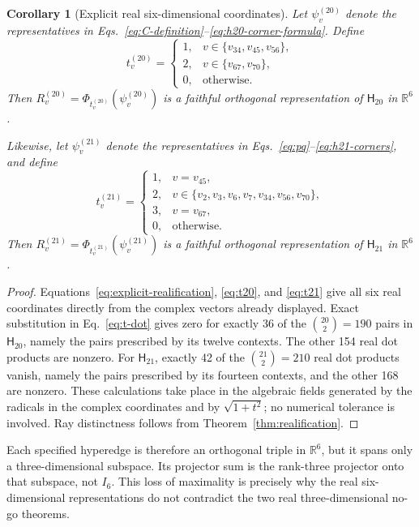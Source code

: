\documentclass[12pt,a4paper]{article}
\newtheorem{corollary}[theorem]{Corollary}
\theoremstyle{definition}
\theoremstyle{remark}
\newcommand{\R}{\mathbb R}
\newcommand{\Htwenty}{\mathsf H_{20}}
\newcommand{\Htwentyone}{\mathsf H_{21}}
\begin{document}
\begin{corollary}[Explicit real six-dimensional coordinates]
\label{cor:r6}
Let $\psi_v^{(20)}$ denote the representatives in
Eqs.~\eqref{eq:C-definition}--\eqref{eq:h20-corner-formula}.  Define
\begin{equation}
 t_v^{(20)}=
 \begin{cases}
  1,&v\in\{v_{34},v_{45},v_{56}\},\\
  2,&v\in\{v_{67},v_{70}\},\\
  0,&\text{otherwise}.
 \end{cases}
 \label{eq:t20}
\end{equation}
Then $R_v^{(20)}=\Phi_{t_v^{(20)}}(\psi_v^{(20)})$ is a faithful orthogonal
representation of $\Htwenty$ in $\R^6$.

Likewise, let $\psi_v^{(21)}$ denote the representatives in
Eqs.~\eqref{eq:pq}--\eqref{eq:h21-corners}, and define
\begin{equation}
 t_v^{(21)}=
 \begin{cases}
  1,&v=v_{45},\\
  2,&v\in\{v_2,v_3,v_6,v_7,v_{34},v_{56},v_{70}\},\\
  3,&v=v_{67},\\
  0,&\text{otherwise}.
 \end{cases}
 \label{eq:t21}
\end{equation}
Then $R_v^{(21)}=\Phi_{t_v^{(21)}}(\psi_v^{(21)})$ is a faithful orthogonal
representation of $\Htwentyone$ in $\R^6$.
\end{corollary}

\begin{proof}
Equations~\eqref{eq:explicit-realification}, \eqref{eq:t20}, and
\eqref{eq:t21} give all six real coordinates directly from the complex
vectors already displayed.  Exact substitution in Eq.~\eqref{eq:t-dot}
gives zero for exactly 36 of the $\binom{20}{2}=190$ pairs in $\Htwenty$,
namely the pairs prescribed by its twelve contexts.  The other 154 real dot
products are nonzero.  For $\Htwentyone$, exactly 42 of the
$\binom{21}{2}=210$ real dot products vanish, namely the pairs prescribed by
its fourteen contexts, and the other 168 are nonzero.  These calculations
take place in the algebraic fields generated by the radicals in the complex
coordinates and by $\sqrt{1+t^2}$; no numerical tolerance is involved.
Ray distinctness follows from Theorem~\ref{thm:realification}.
\end{proof}

Each specified hyperedge is therefore an orthogonal triple in
$\R^6$, but it spans only a three-dimensional subspace.  Its projector sum
is the rank-three projector onto that subspace, not $I_6$.  This loss of
maximality is precisely why the real six-dimensional representations do not
contradict the two real three-dimensional no-go theorems.
\end{document}
